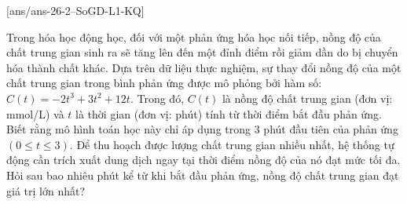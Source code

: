 \caukq
{}[ans/ans-26-2--SoGD-L1-KQ]
\begin{ex}%
	Trong hóa học động học, đối với một phản ứng hóa học nối tiếp, nồng độ của chất trung gian sinh ra sẽ tăng lên đến một đỉnh điểm rồi giảm dần do bị chuyển hóa thành chất khác. Dựa trên dữ liệu thực nghiệm, sự thay đổi nồng độ của một chất trung gian trong bình phản ứng được mô phỏng bởi hàm số: $C(t)=-2t^3+3t^2+12t$. Trong đó, $C(t)$ là nồng độ chất trung gian (đơn vị: mmol/L) và $t$ là thời gian (đơn vị: phút) tính từ thời điểm bắt đầu phản ứng. Biết rằng mô hình toán học này chỉ áp dụng trong $3$ phút đầu tiên của phản ứng $(0\le t\le 3)$. Để thu hoạch được lượng chất trung gian nhiều nhất, hệ thống tự động cần trích xuất dung dịch ngay tại thời điểm nồng độ của nó đạt mức tối đa. Hỏi sau bao nhiêu phút kể từ khi bắt đầu phản ứng, nồng độ chất trung gian đạt giá trị lớn nhất?
\end{ex}

